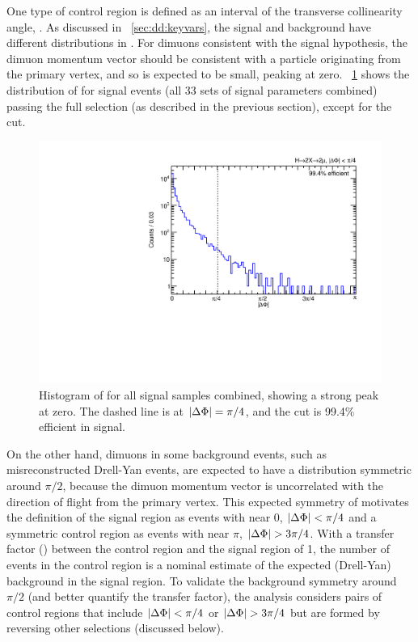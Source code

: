 One type of control region is defined as an interval of the transverse collinearity angle, \DeltaPhi.
As discussed in \Sec~\ref{sec:dd:keyvars}, the signal and background have different distributions in \DeltaPhi.
For dimuons consistent with the signal hypothesis, the dimuon momentum vector should be consistent with a particle originating from the primary vertex, and so \DeltaPhi is expected to be small, peaking at zero.
\Fig~\ref{fig:dd:deltaPhi_Sig} shows the distribution of \DeltaPhi for \twoMu signal events (all 33 sets of signal parameters combined) passing the full selection (as described in the previous section), except for the \DeltaPhi cut.

\begin{figure}[htpb]
  \centering
  \includegraphics[width=\DFigWidth]{figures/displaced/NM1_2Mu2J_deltaPhi.pdf}
  \caption[Histogram of \DeltaPhi for all \twoMu signal samples combined, showing a strong peak at zero.]{Histogram of \DeltaPhi for all \twoMu signal samples combined, showing a strong peak at zero. The dashed line is at $|\Delta\Phi| = \pi/4$, and the cut is 99.4\% efficient in signal.}
  \label{fig:dd:deltaPhi_Sig}
\end{figure}

On the other hand, dimuons in some background events, such as misreconstructed Drell-Yan events, are expected to have a \DeltaPhi distribution symmetric around $\pi/2$, because the dimuon momentum vector is uncorrelated with the direction of flight from the primary vertex.
This expected symmetry of \DeltaPhi motivates the definition of the signal region as events with \DeltaPhi near 0, \ie $|\Delta\Phi| < \pi/4$ and a symmetric control region as events with \DeltaPhi near $\pi$, \ie $|\Delta\Phi| > 3\pi/4$.
With a transfer factor (\TF) between the control region and the signal region of 1, the number of events in the control region is a nominal estimate of the expected (Drell-Yan) background in the signal region.
To validate the background symmetry around $\pi/2$ (and better quantify the transfer factor), the analysis considers pairs of control regions that include $|\Delta\Phi| < \pi/4$ or $|\Delta\Phi| > 3\pi/4$ but are formed by reversing other selections (discussed below).

